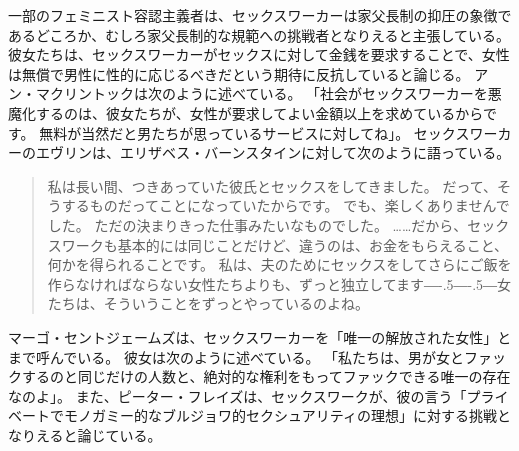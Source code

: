 \documentclass[paper=a4,book,openany]{jlreq}
\newcommand{\ig}[1]{}           %
\def\DDASH{―\kern-.5\zw―\kern-.5\zw―} %
\begin{document}
一部のフェミニスト容認主義者は、セックスワーカーは家父長制の抑圧の象徴であるどころか、むしろ家父長制的な規範への挑戦者となりえると主張している。
彼女たちは、セックスワーカーがセックスに対して金銭を要求することで、女性は無償で男性に性的に応じるべきだという期待に反抗していると論じる。
アン・マクリントックは次のように述べている。
「社会がセックスワーカーを悪魔化するのは、彼女たちが、女性が要求してよい金額以上を求めているからです。
無料が当然だと男たちが思っているサービスに対してね」\citep[p.1]{mcclintock93:_sex_worker_sex_work}。
セックスワーカーのエヴリンは、エリザベス・バーンスタインに対して次のように語っている。

\begin{quote}
私は長い間、つきあっていた彼氏とセックスをしてきました。
だって、そうするものだってことになっていたからです。
でも、楽しくありませんでした。
ただの決まりきった仕事みたいなものでした。
……だから、セックスワークも基本的には同じことだけど、違うのは、お金をもらえること、何かを得られることです。
私は、夫のためにセックスをしてさらにご飯を作らなければならない女性たちよりも、ずっと独立してます{\DDASH}女たちは、そういうことをずっとやっているのよね。
\citep[p.106]{bernstein99:_whats_wrong_prost}\ig{Elizabeth Bernstein}
\end{quote}

マーゴ・セントジェームズは、セックスワーカーを「唯一の解放された女性」とまで呼んでいる。
彼女は次のように述べている。
「私たちは、男が女とファックするのと同じだけの人数と、絶対的な権利をもってファックできる唯一の存在なのよ」\citep[p.84]{james87:_reclam_whores}。
また、ピーター・フレイズは、セックスワークが、彼の言う「プライベートでモノガミー的なブルジョワ的セクシュアリティの理想」に対する挑戦となりえると論じている\citep{frase12:_probl_sex_work}。
\end{document}
